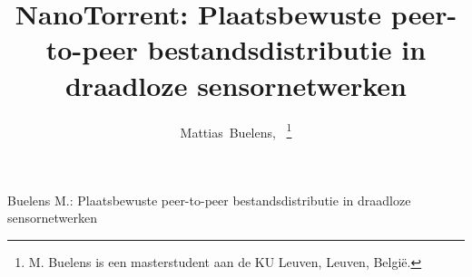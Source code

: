 \documentclass[journal]{IEEEtran}
\begin{document}
%
\title{NanoTorrent: Plaatsbewuste peer-to-peer bestandsdistributie in draadloze sensornetwerken}
%
%
%
\author{Mattias~Buelens,~%
\thanks{M. Buelens is een masterstudent aan de KU Leuven, Leuven, Belgi\"e.}}%

% 
%



%
{Buelens M.: Plaatsbewuste peer-to-peer bestandsdistributie in draadloze sensornetwerken}
% 
\end{document}
